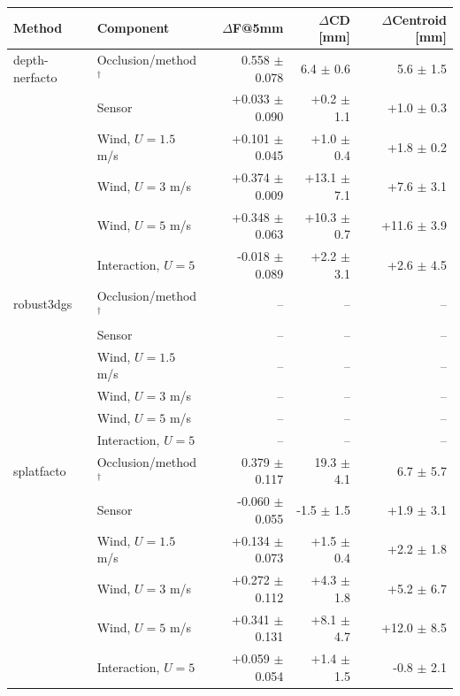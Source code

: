 \begin{tabular}{llrrr}
\toprule
Method & Component & $\Delta$F@5mm & $\Delta$CD [mm] & $\Delta$Centroid [mm] \\
\midrule
depth-nerfacto & Occlusion/method$^{\dagger}$ & 0.558 $\pm$ 0.078 & 6.4 $\pm$ 0.6 & 5.6 $\pm$ 1.5 \\
 & Sensor & +0.033 $\pm$ 0.090 & +0.2 $\pm$ 1.1 & +1.0 $\pm$ 0.3 \\
 & Wind, $U=1.5$ m/s & +0.101 $\pm$ 0.045 & +1.0 $\pm$ 0.4 & +1.8 $\pm$ 0.2 \\
 & Wind, $U=3$ m/s & +0.374 $\pm$ 0.009 & +13.1 $\pm$ 7.1 & +7.6 $\pm$ 3.1 \\
 & Wind, $U=5$ m/s & +0.348 $\pm$ 0.063 & +10.3 $\pm$ 0.7 & +11.6 $\pm$ 3.9 \\
 & Interaction, $U=5$ & -0.018 $\pm$ 0.089 & +2.2 $\pm$ 3.1 & +2.6 $\pm$ 4.5 \\
\midrule
robust3dgs & Occlusion/method$^{\dagger}$ & -- & -- & -- \\
 & Sensor & -- & -- & -- \\
 & Wind, $U=1.5$ m/s & -- & -- & -- \\
 & Wind, $U=3$ m/s & -- & -- & -- \\
 & Wind, $U=5$ m/s & -- & -- & -- \\
 & Interaction, $U=5$ & -- & -- & -- \\
\midrule
splatfacto & Occlusion/method$^{\dagger}$ & 0.379 $\pm$ 0.117 & 19.3 $\pm$ 4.1 & 6.7 $\pm$ 5.7 \\
 & Sensor & -0.060 $\pm$ 0.055 & -1.5 $\pm$ 1.5 & +1.9 $\pm$ 3.1 \\
 & Wind, $U=1.5$ m/s & +0.134 $\pm$ 0.073 & +1.5 $\pm$ 0.4 & +2.2 $\pm$ 1.8 \\
 & Wind, $U=3$ m/s & +0.272 $\pm$ 0.112 & +4.3 $\pm$ 1.8 & +5.2 $\pm$ 6.7 \\
 & Wind, $U=5$ m/s & +0.341 $\pm$ 0.131 & +8.1 $\pm$ 4.7 & +12.0 $\pm$ 8.5 \\
 & Interaction, $U=5$ & +0.059 $\pm$ 0.054 & +1.4 $\pm$ 1.5 & -0.8 $\pm$ 2.1 \\
\bottomrule
\end{tabular}
